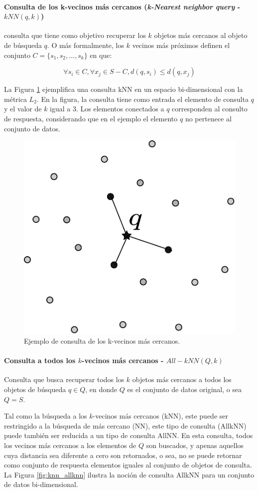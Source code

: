 \paragraph{Consulta de los k-vecinos más cercanos (\textit{k-Nearest neighbor query} - $kNN (q, k)$)} consulta que tiene como objetivo recuperar los $k$ objetos más cercanos al objeto de búsqueda $q$. O más formalmente, los $k$ vecinos más próximos definen el conjunto  $ C = \{s_1,s_2,...,s_k\} $ en que:

\begin{equation}
    \forall s_i \in C, \forall x_j \in S - C, d(q, s_i) \leq d(q, x_j)
\end{equation}

La Figura \ref{fig:knnQuery} ejemplifica una consulta kNN en un espacio bi-dimensional con la métrica $L_2$. En la figura, la consulta tiene como entrada el elemento de consulta $q$ y el valor de $k$ igual a $3$.  Los elementos conectados a $q$ corresponden al consulto de respuesta, considerando que en el ejemplo el elemento $q$ no pertenece al conjunto de datos.

\begin{figure}[htp]
\centering
\includegraphics[width=0.28\columnwidth]{chapter2/knn_query.pdf}
\caption{Ejemplo  de consulta de los k-vecinos más cercanos.}
\label{fig:knnQuery}
\end{figure}

\paragraph{Consulta a todos los $k$-vecinos más cercanos - $All-kNN (Q, k)$ }

Consulta que busca recuperar todos los $k$ objetos más cercanos a todos los objetos de búsqueda $q \in Q$, en donde $Q$ es el conjunto de datos original, o sea $Q=S$.

Tal como la búsqueda a los $k$-vecinos más cercanos (kNN), este puede ser restringido a la búsqueda de más cercano (NN), este tipo de consulta (AllkNN) puede también  ser reducida a un tipo de consulta AllNN. En esta consulta, todos los vecinos más cercanos a los elementos de $Q$ son buscados, y apenas aquellos cuya distancia sea diferente a cero son retornados, o sea, no se puede retornar como conjunto de respuesta elementos iguales al conjunto de objetos de consulta. La Figura \ref{fig:knn_allknn}  ilustra la noción de consulta AllkNN para un conjunto de datos bi-dimensional.

